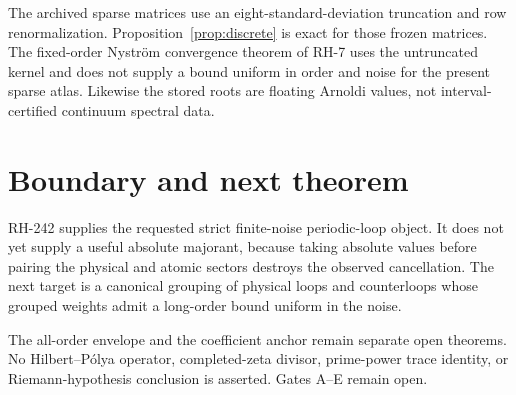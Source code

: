 \documentclass[11pt]{article}
\theoremstyle{remark}
\begin{document}
The archived sparse matrices use an eight-standard-deviation truncation and
row renormalization.  Proposition~\ref{prop:discrete} is exact for those
frozen matrices.  The fixed-order Nystr\"om convergence theorem of RH-7 uses
the untruncated kernel and does not supply a bound uniform in order and noise
for the present sparse atlas.  Likewise the stored roots are floating
Arnoldi values, not interval-certified continuum spectral data.

\section{Boundary and next theorem}

RH-242 supplies the requested strict finite-noise periodic-loop object.  It
does not yet supply a useful absolute majorant, because taking absolute values
before pairing the physical and atomic sectors destroys the observed
cancellation.  The next target is a canonical grouping of physical loops and
counterloops whose grouped weights admit a long-order bound uniform in the
noise.

The all-order envelope and the coefficient anchor remain separate open
theorems.  No Hilbert--P\'olya operator, completed-zeta divisor, prime-power
trace identity, or Riemann-hypothesis conclusion is asserted.  Gates A--E
remain open.

\small
\setlength{\bibsep}{2pt}


\end{document}
